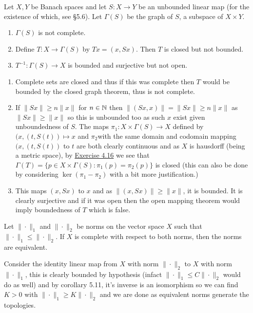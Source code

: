 \documentclass[12pt,a4paper]{article}
\begin{document}
\begin{problem}\label{prob:5-31}
Let $X, Y$ be Banach spaces and let $S : X \rightarrow Y$ be an unbounded linear map (for the existence of which, see \S5.6). Let $\Gamma(S)$ be the graph of $S$, a subspace of $X \times Y$.
\begin{enumerate}[label=\alph*.]
\item $\Gamma(S)$ is not complete.
\item Define $T : X \rightarrow \Gamma(S)$ by $Tx = (x,Sx)$. Then $T$ is closed but not bounded.
\item $T^{-1} : \Gamma(S) \rightarrow X$ is bounded and surjective but not open.
\end{enumerate}
\end{problem}
\begin{solution}
\begin{enumerate}[label=\alph*.]
    \item Complete sets are closed and thus if this was complete then $T$ would be bounded by the closed graph theorem, thus is not complete. 
    \item If $\|Sx\|\geq n\|x\|$ for $n\in\mathbb{N}$ then $\|(Sx,x)\|=\|Sx\|\geq n\|x\|$ as $\|Sx\|\geq\|x\|$ so this is unbounded too as such $x$ exist given unboundedness of $S.$ 
        The maps $\pi_1:X\times\Gamma(S)\to X$ defined by $(x,(t,S(t))\mapsto x$ and $\pi_2$with the same domain and codomain mapping $(x,(t,S(t))$ to $t$ are both clearly continuous and as $X$ is hausdorff (being a metric space), by \hyperref[prob:4-16]{Exercise 4.16} we see that $\Gamma(T)=\{p\in X\times\Gamma(S):\pi_1(p)=\pi_2(p)\}$ is closed (this can also be done by considering $\ker(\pi_1-\pi_2)$ with a bit more justification.) 
    \item This maps $(x,Sx)$ to $x$ and as $\|(x,Sx)\|\geq\|x\|$, it is bounded. 
        It is clearly surjective and if it was open then the open mapping theorem would imply boundedness of $T$ which is false. 
\end{enumerate}
\end{solution}
\begin{problem}\label{prob:5-32}
Let $\|\cdot\|_1$ and $\|\cdot\|_2$ be norms on the vector space $X$ such that $\|\cdot\|_1 \le \|\cdot\|_2$. If $X$ is complete with respect to both norms, then the norms are equivalent.
\end{problem}
\begin{solution}
    Consider the identity linear map from $X$ with norm $\|\cdot\|_2$ to $X$ with norm $\|\cdot\|_1$, this is clearly bounded by hypothesis (infact $\|\cdot\|_1\leq C\|\cdot\|_2$ would do as well) and by corollary 5.11, it's inverse is an isomorphism so we can find $K>0$ with $\|\cdot\|_1\geq K\|\cdot\|_2$ and we are done as equivalent norms generate the topologies.   
\end{solution}
\end{document}
